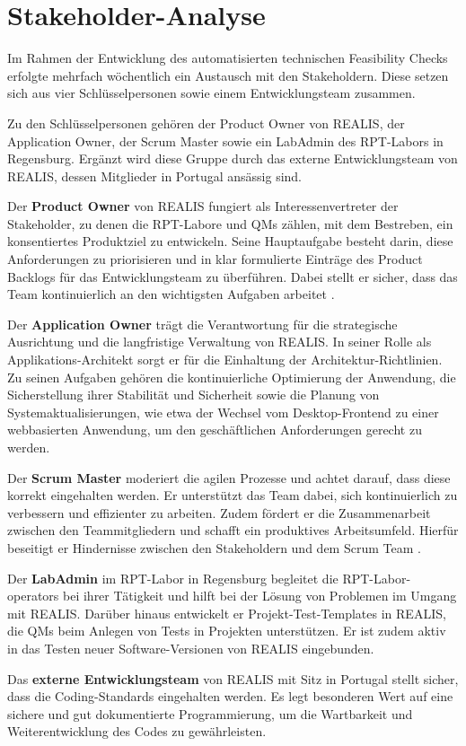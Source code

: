 \section{Stakeholder-Analyse}
Im Rahmen der Entwicklung des automatisierten technischen Feasibility Checks erfolgte mehrfach wöchentlich ein Austausch mit den Stakeholdern. Diese setzen sich aus vier Schlüsselpersonen sowie einem Entwicklungsteam zusammen.

Zu den Schlüsselpersonen gehören der Product Owner von \gls{REALIS}, der Application Owner, der Scrum Master sowie ein LabAdmin des \gls{RPT}-Labors in Regensburg. Ergänzt wird diese Gruppe durch das externe Entwicklungsteam von \gls{REALIS}, dessen Mitglieder in Portugal ansässig sind.

Der \textbf{Product Owner} von \gls{REALIS} fungiert als Interessenvertreter der Stakeholder, zu denen die \gls{RPT}-Labore und \glspl{QM} zählen, mit dem Bestreben, ein konsentiertes Produktziel zu entwickeln. Seine Hauptaufgabe besteht darin, diese Anforderungen zu priorisieren und in klar formulierte Einträge des Product Backlogs für das Entwicklungsteam zu überführen. Dabei stellt er sicher, dass das Team kontinuierlich an den wichtigsten Aufgaben arbeitet \cite{scrumguide2020}.

Der \textbf{Application Owner} trägt die Verantwortung für die strategische Ausrichtung und die langfristige Verwaltung von \gls{REALIS}. In seiner Rolle als Applikations-Architekt sorgt er für die Einhaltung der Architektur-Richtlinien. Zu seinen Aufgaben gehören die kontinuierliche Optimierung der Anwendung, die Sicherstellung ihrer Stabilität und Sicherheit sowie die Planung von Systemaktualisierungen, wie etwa der Wechsel vom Desktop-Frontend zu einer webbasierten Anwendung, um den geschäftlichen Anforderungen gerecht zu werden.

Der \textbf{Scrum Master} moderiert die agilen Prozesse und achtet darauf, dass diese korrekt eingehalten werden. Er unterstützt das Team dabei, sich kontinuierlich zu verbessern und effizienter zu arbeiten. Zudem fördert er die Zusammenarbeit zwischen den Teammitgliedern und schafft ein produktives Arbeitsumfeld. Hierfür beseitigt er Hindernisse zwischen den Stakeholdern und dem Scrum Team \cite{scrumguide2020}.

Der \textbf{LabAdmin} im \gls{RPT}-Labor in Regensburg begleitet die \gls{RPT}-Labor-\glspl{operator} bei ihrer Tätigkeit und hilft bei der Lösung von Problemen im Umgang mit \gls{REALIS}. Darüber hinaus entwickelt er Projekt-Test-Templates in \gls{REALIS}, die \glspl{QM} beim Anlegen von Tests in Projekten unterstützen. Er ist zudem aktiv in das Testen neuer Software-Versionen von \gls{REALIS} eingebunden.


Das \textbf{externe Entwicklungsteam} von \gls{REALIS} mit Sitz in Portugal stellt sicher, dass die Coding-Standards eingehalten werden. Es legt besonderen Wert auf eine sichere und gut dokumentierte Programmierung, um die Wartbarkeit und Weiterentwicklung des Codes zu gewährleisten.